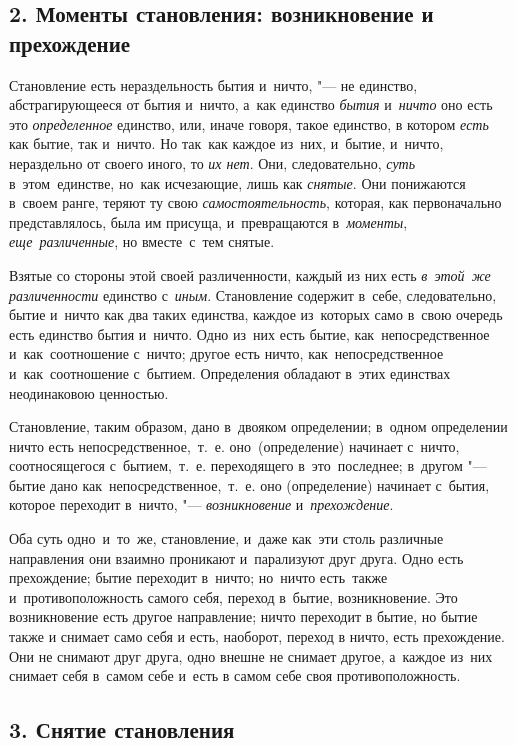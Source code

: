 \subsection[2. Моменты становления: возникновение и прехождение]{2. Моменты становления: возникновение и прехождение}

Становление есть нераздельность бытия и~ничто, "---
не единство, абстрагирующееся от бытия и~ничто, а~как единство
{\em бытия} и~{\em ничто} оно есть
это {\em определенное} единство, или, иначе говоря,
такое единство, в котором {\em есть} как бытие, так и~ничто.
Но так~как каждое из~них, и~бытие, и~ничто, нераздельно от своего
иного, то {\em их нет}. Они, следовательно,
{\em суть} в~этом~единстве, но~как исчезающие, лишь как
{\em снятые}. Они понижаются в~своем ранге, теряют ту
свою {\em самостоятельность}, которая, как
первоначально представлялось, была им присуща, и~превращаются
в~{\em моменты}, {\em еще~различенные}, но вместе~с~тем снятые.

Взятые со стороны этой своей различенности, каждый из них есть
{\em в~этой~же различенности} единство с~{\em иным}.
Становление содержит в~себе, следовательно, бытие
и~ничто как два таких единства, каждое из~которых само
в~свою очередь есть единство бытия и~ничто. Одно из~них есть бытие,
как~непосредственное и~как~соотношение с~ничто; другое есть ничто,
как~непосредственное и~как~соотношение с~бытием. Определения обладают
в~этих единствах неодинаковою ценностью.

Становление, таким образом, дано в~двояком определении; в~одном определении
ничто есть непосредственное,~т.~е. оно~(определение) начинает с~ничто,
соотносящегося с~бытием,~т.~е. переходящего в~это~последнее; в~другом
"--- бытие дано как~непосредственное,~т.~е. оно (определение) начинает
с~бытия, которое переходит в~ничто, "--- {\em возникновение}
и~{\em прехождение}.

Оба суть одно~и~то~же, становление, и~даже как~эти столь различные
направления они взаимно проникают и~парализуют друг друга. Одно есть
прехождение; бытие переходит в~ничто; но~ничто есть~также
и~противоположность самого себя, переход в~бытие, возникновение. Это
возникновение есть другое направление; ничто переходит в бытие, но бытие
также и снимает само себя и есть, наоборот, переход в ничто, есть
прехождение. Они не снимают друг друга, одно внешне не снимает другое,
а~каждое из~них снимает себя в~самом себе и~есть в самом себе 
своя противоположность.

\subsection[3. Снятие становления]{3. Снятие становления}

